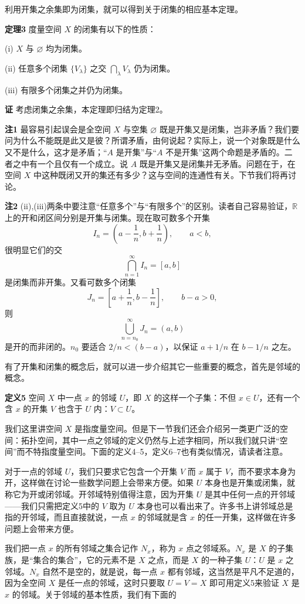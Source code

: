 利用开集之余集即为闭集，就可以得到关于闭集的相应基本定理。

\noindent\textbf{定理3}\quad
度量空间 $X$ 的闭集有以下的性质：

(i) $X$ 与 $\varnothing$ 均为闭集。

(ii) 任意多个闭集 $\{V_\lambda\}$ 之交 $\bigcap_\lambda V_\lambda$ 仍为闭集。

(iii) 有限多个闭集之并仍为闭集。

\noindent\textbf{证}\quad
考虑闭集之余集，本定理即归结为定理2。

\noindent\textbf{注1}\quad
最容易引起误会是全空间 $X$ 与空集 $\varnothing$ 既是开集又是闭集，岂非矛盾？我们要问为什么不能既是此又是彼？所谓矛盾，由何说起？实际上，说一个对象既是什么又不是什么，这才是矛盾；“$A$ 是开集”与“$A$ 不是开集”这两个命题是矛盾的。二者之中有一个且仅有一个成立。说 $A$ 既是开集又是闭集并无矛盾。问题在于，在空间 $X$ 中这种既闭又开的集还有多少？这与空间的连通性有关。下节我们将再讨论。

\noindent\textbf{注2}\quad
(ii),(iii)两条中要注意“任意多个”与“有限多个”的区别。读者自己容易验证，$\mathbb R$ 上的开和闭区间分别是开集与闭集。现在取可数多个开集
\[
 I_n=\left(a-\frac1n,b+\frac1n\right),\qquad a<b,
\]
很明显它们的交
\[
 \bigcap_{n=1}^\infty I_n=[a,b]
\]
是闭集而非开集。又看可数多个闭集
\[
 J_n=\left[a+\frac1n,b-\frac1n\right],\qquad b-a>0,
\]
则
\[
 \bigcup_{n=n_0}^\infty J_n=(a,b)
\]
是开的而非闭的。$n_0$ 要适合 $2/n<(b-a)$，以保证 $a+1/n$ 在 $b-1/n$ 之左。

有了开集和闭集的概念后，就可以进一步介绍其它一些重要的概念，首先是邻域的概念。

\noindent\textbf{定义5}\quad
空间 $X$ 中一点 $x$ 的邻域 $U$，即 $X$ 的这样一个子集：不但 $x\in U$，还有一个含 $x$ 的开集 $V$ 也含于 $U$ 内：$V\subset U$。

我们这里讲空间 $X$ 是指度量空间。但是下一节我们还会介绍另一类更广泛的空间：拓扑空间，其中一点之邻域的定义仍然与上述字相同，所以我们就只讲“空间”而不特指度量空间。下面的定义4--5，定义6--7也有类似情况，请读者注意。

对于一点的邻域 $U$，我们只要求它包含一个开集 $V$ 而 $x$ 属于 $V$，而不要求本身为开，这样做在讨论一些数学问题上会带来方便。如果 $U$ 本身也是开集或闭集，就称它为开或闭邻域。开邻域特别值得注意，因为开集 $U$ 是其中任何一点的开邻域——我们只需把定义5中的 $V$ 取为 $U$ 本身也可以看出来了。许多书上讲邻域总是指的开邻域，而且直接就说，一点 $x$ 的邻域就是含 $x$ 的任一开集，这样做在许多问题上会带来方便。

我们把一点 $x$ 的所有邻域之集合记作 $N_x$，称为 $x$ 点之邻域系。$N_x$ 是 $X$ 的子集族，是“集合的集合”，它的元素不是 $X$ 之点，而是 $X$ 的一种子集 $U$：$U$ 是 $x$ 之邻域。$N_x$ 自然不是空的，就是说，每一点 $x$ 都有邻域，这当然是平凡不足道的，因为全空间 $X$ 是任一点的邻域，这时只要取 $U=V=X$ 即可用定义5来验证 $X$ 是 $x$ 的邻域。关于邻域的基本性质，我们有下面的

